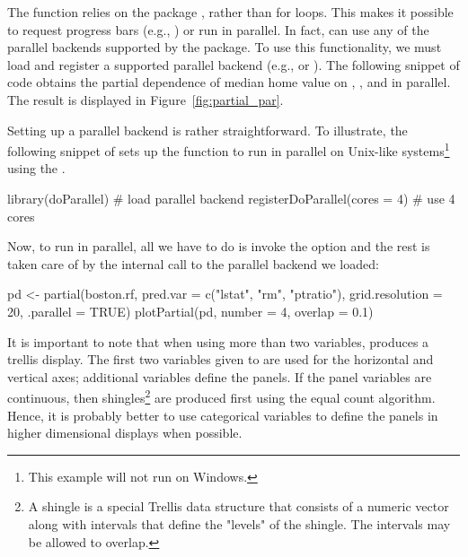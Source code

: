 The  function relies on the  package \citep{plyr-pkg}, rather than for loops. This makes it possible to request progress bars (e.g., ) or run  in parallel. In fact,  can use any of the parallel backends supported by the  package. To use this functionality, we must load and register a supported parallel backend (e.g.,  \citep{doMC-pkg} or  \citep{doParallel-pkg}). The following snippet of code obtains the partial dependence of median home value on , , and  in parallel. The result is displayed in Figure~\ref{fig:partial_par}.

Setting up a parallel backend is rather straightforward. To illustrate, the following snippet of sets up the  function to run in parallel on Unix-like systems\footnote{This example will not run on Windows.} using the .
\begin{example}
library(doParallel)  # load parallel backend
registerDoParallel(cores = 4)  # use 4 cores
\end{example}
Now, to run  in parallel, all we have to do is invoke the  option and the rest is taken care of by the internal call to  the parallel backend we loaded:
\begin{example}
pd <- partial(boston.rf, pred.var = c("lstat", "rm", "ptratio"),
              grid.resolution = 20, .parallel = TRUE)
plotPartial(pd, number = 4, overlap = 0.1)
\end{example}

It is important to note that when using more than two variables,  produces a trellis display. The first two variables given to  are used for the horizontal and vertical axes; additional variables define the panels. If the panel variables are continuous, then shingles\footnote{A shingle is a special Trellis data structure that consists of a numeric vector along with intervals that define the "levels" of the shingle. The intervals may be allowed to overlap.} are produced first using the equal count algorithm. Hence, it is probably better to use categorical variables to define the panels in higher dimensional displays when possible.

